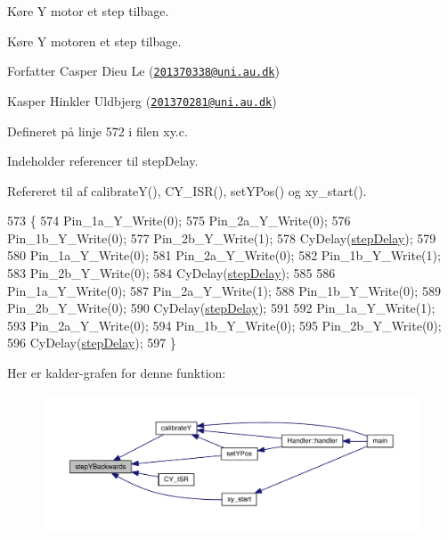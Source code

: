 Køre Y motor et step tilbage. 

Køre Y motoren et step tilbage.

\begin{DoxyAuthor}{Forfatter}
Casper Dieu Le (\href{mailto:201370338@uni.au.dk}{\tt 201370338@uni.\+au.\+dk}) 

Kasper Hinkler Uldbjerg (\href{mailto:201370281@uni.au.dk}{\tt 201370281@uni.\+au.\+dk}) 
\end{DoxyAuthor}


Defineret på linje 572 i filen xy.\+c.



Indeholder referencer til step\+Delay.



Refereret til af calibrate\+Y(), C\+Y\+\_\+\+I\+S\+R(), set\+Y\+Pos() og xy\+\_\+start().


\begin{DoxyCode}
573 \{
574   Pin\_1a\_Y\_Write(0);
575   Pin\_2a\_Y\_Write(0);
576   Pin\_1b\_Y\_Write(0);
577   Pin\_2b\_Y\_Write(1);
578   CyDelay(\hyperlink{xy_8h_af24cf99e186a696ed4f58aff71d09249}{stepDelay});
579   
580   Pin\_1a\_Y\_Write(0);
581   Pin\_2a\_Y\_Write(0);
582   Pin\_1b\_Y\_Write(1);
583   Pin\_2b\_Y\_Write(0);
584   CyDelay(\hyperlink{xy_8h_af24cf99e186a696ed4f58aff71d09249}{stepDelay});
585   
586   Pin\_1a\_Y\_Write(0);
587   Pin\_2a\_Y\_Write(1);
588   Pin\_1b\_Y\_Write(0);
589   Pin\_2b\_Y\_Write(0);
590   CyDelay(\hyperlink{xy_8h_af24cf99e186a696ed4f58aff71d09249}{stepDelay});
591   
592   Pin\_1a\_Y\_Write(1);
593   Pin\_2a\_Y\_Write(0);
594   Pin\_1b\_Y\_Write(0);
595   Pin\_2b\_Y\_Write(0);
596   CyDelay(\hyperlink{xy_8h_af24cf99e186a696ed4f58aff71d09249}{stepDelay});
597 \}
\end{DoxyCode}


Her er kalder-\/grafen for denne funktion\+:\nopagebreak
\begin{figure}[H]
\begin{center}
\leavevmode
\includegraphics[width=350pt]{db/d87/class_x_y_aea96dacda1955992c5436dcb829daa26_icgraph}
\end{center}
\end{figure}


